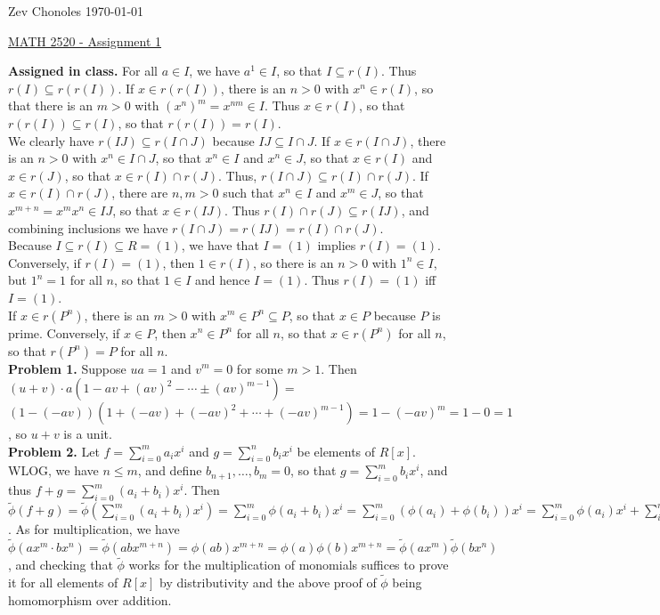 \documentclass[11pt]{article}
\newcommand{\num}[1]{\noindent \textbf{#1}}
\theoremstyle{definition}
\begin{document}
\noindent Zev Chonoles \hfill \today\\[-0.4in]
\begin{center}
\noindent \underline{MATH 2520 - Assignment 1}
\end{center}

\num{Assigned in class.} For all $a\in I$, we have $a^1\in I$, so that $ I\subseteq r(I)$. Thus $r(I)\subseteq r(r(I))$. If $x\in r(r(I))$, there is an $n>0$ with $x^n\in r(I)$, so that there is an $m>0$ with $(x^n)^m=x^{nm}\in I$. Thus $x\in r(I)$, so that $r(r(I))\subseteq r(I)$, so that $r(r(I))=r(I)$.\\

We clearly have $r(IJ)\subseteq r(I\cap J)$ because $IJ\subseteq I\cap J$. If $x\in r(I\cap J)$, there is an $n>0$ with $x^n\in I\cap J$, so that $x^n\in I$ and $x^n\in J$, so that $x\in r(I)$ and $x\in r(J)$, so that $x\in r(I)\cap r(J)$. Thus, $r(I\cap J)\subseteq r(I)\cap r(J)$. If $x\in r(I)\cap r(J)$, there are $n,m>0$ such that $x^n\in I$ and $x^m\in J$, so that $x^{m+n}=x^mx^n\in IJ$, so that $x\in r(IJ)$. Thus $r(I)\cap r(J)\subseteq r(IJ)$, and combining inclusions we have $r(I\cap J)=r(IJ)=r(I)\cap r(J)$.\\

Because $I\subseteq r(I)\subseteq R = (1)$, we have that $I=(1)$ implies $r(I)=(1)$. Conversely, if $r(I)=(1)$, then $1\in r(I)$, so there is an $n>0$ with $1^n\in I$, but $1^n=1$ for all $n$, so that $1\in I$ and hence $I=(1)$. Thus $r(I)=(1)$ iff $I=(1)$.\\

If $x\in r(P^n)$, there is an $m>0$ with $x^m\in P^n\subseteq P$, so that $x\in P$ because $P$ is prime. Conversely, if $x\in P$, then $x^n\in P^n$ for all $n$, so that $x\in r(P^n)$ for all $n$, so that $r(P^n)=P$ for all $n$.\\

\num{Problem 1.} Suppose $ua=1$ and $v^m=0$ for some $m>1$. Then  $(u+v)\cdot a(1-av+(av)^2-\cdots\pm(av)^{m-1})=$ $(1-(-av))(1+(-av)+(-av)^2+\cdots+(-av)^{m-1})=1-(-av)^m=1-0=1$, so $u+v$ is a unit. \\

\num{Problem 2.} Let $f=\sum_{i=0}^m a_ix^i$ and $g=\sum_{i=0}^n b_ix^i$ be elements of $R[x]$. WLOG, we have $n\leq m$, and define $b_{n+1},\ldots,b_m=0$, so that $g=\sum_{i=0}^m b_ix^i$, and thus $f+g=\sum_{i=0}^m (a_i+b_i)x^i$. Then $\tilde{\phi}(f+g)=\tilde{\phi}(\sum_{i=0}^m (a_i+b_i)x^i)=\sum_{i=0}^m\phi(a_i+b_i)x^i=\sum_{i=0}^m(\phi(a_i)+\phi(b_i))x^i=\sum_{i=0}^m\phi(a_i)x^i+\sum_{i=0}^m\phi(b_i)x^i=\tilde{\phi}(f)+\tilde{\phi}(g)$. As for multiplication, we have $\tilde{\phi}(ax^m\cdot bx^n)=\tilde{\phi}(abx^{m+n})=\phi(ab)x^{m+n}=\phi(a)\phi(b)x^{m+n}=\tilde{\phi}(ax^m)\tilde{\phi}(bx^n)$, and checking that $\tilde{\phi}$ works for the multiplication of monomials suffices to prove it for all elements of $R[x]$ by distributivity and the above proof of $\tilde{\phi}$ being homomorphism over addition. \\
\end{document}

